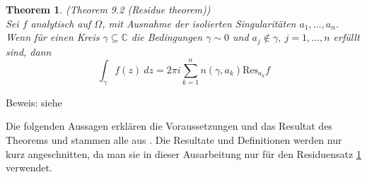 \documentclass[a4paper,12pt]{report}
\newcommand{\C}{\mathbb C}
\newcommand{\1}{\mathds{1}}
\newcommand{\Res}{\text{Res}}
\theoremstyle{plain} %
\newtheorem{theorem}{Theorem}
\theoremstyle{definition} %
\theoremstyle{remark}
\begin{document}
            \begin{theorem}(Theorem 9.2 (Residue theorem)\cite[S. 141]{complexAnalysis})\\
                  \label{thrm: Residuensatz}
                  Sei $f$ analytisch auf $\Omega$, mit Ausnahme der isolierten Singularitäten $a_1,\dots,a_n$. Wenn für einen Kreis $\gamma\subseteq\C$ die Bedingungen $\gamma \sim 0$ und $a_j\notin \gamma,\ j=1,\dots,n$ erfüllt sind, dann
                  $$\int_\gamma f(z)\ dz = 2\pi i\sum_{k=1}^{n} n(\gamma, a_k)\Res_{a_k}f$$
            \end{theorem}
            Beweis: siehe \cite[S. 142]{complexAnalysis}

            Die folgenden Aussagen erklären die Voraussetzungen und das Resultat des Theorems und stammen alle aus \cite{complexAnalysis}.
            Die Resultate und Definitionen werden nur kurz angeschnitten, da man sie in dieser Ausarbeitung nur für den Residuensatz \ref{thrm: Residuensatz} verwendet.
\end{document}
